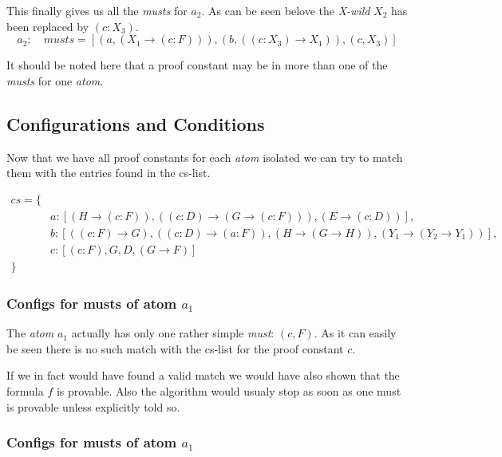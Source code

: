 This finally gives us all the \emph{musts} for $a_2$. As can be seen belove the \emph{X-wild} $X_2$ has been replaced by $(c:X_3)$.
\begin{equation}
	a_2: \quad musts = [(a, (X_1 \rightarrow (c:F))), (b, ((c:X_3) \rightarrow X_1)), (c, X_3)]
\end{equation}

It should be noted here that a proof constant may be in more than one of the \emph{musts} for one \emph{atom}. 

\subsection{Configurations and Conditions}
Now that we have all proof constants for each \emph{atom} isolated we can try to match them with the entries found in the cs-list.

\begin{equation*}
\begin{split}
	cs = \{\\
	& a: [(H \rightarrow (c:F)), ((c:D) \rightarrow (G \rightarrow (c:F))), (E \rightarrow (c:D))],\\
	& b: [((c:F) \rightarrow G), ((c:D) \rightarrow (a:F)), (H \rightarrow (G \rightarrow H)), (Y_1 \rightarrow (Y_2 \rightarrow Y_1))],\\
	& c: [(c:F), G, D, (G \rightarrow F)] \\
	\}
\end{split}
\end{equation*}

\subsubsection[Config for a1]{Configs for musts of atom $a_1$}
The \emph{atom} $a_1$ actually has only one rather simple \emph{must}: $(c,F)$. As it can easily be seen there is no such match with the cs-list for the proof constant $c$.

If we in fact would have found a valid match we would have also shown that the formula $f$ is provable. Also the algorithm would usualy stop as soon as one must is provable unless explicitly told so.

\subsubsection[Config for a2]{Configs for musts of atom $a_1$}

